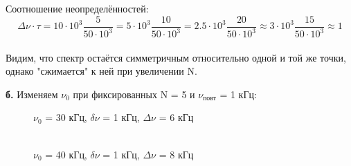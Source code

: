 \documentclass[a4paper,12pt]{article} %
\begin{document}
\begin{enumerate}
	      Соотношение неопределённостей:
	      $$ \Delta \nu \cdot \tau = 10\cdot10^3\frac{5}{50\cdot10^3} = 5\cdot10^3\frac{10}{50\cdot10^3} = 2.5\cdot10^3\frac{20}{50\cdot10^3} \approx 3\cdot10^3\frac{15}{50\cdot10^3} \approx 1 $$\\

	      Видим, что спектр остаётся симметричным относительно одной и той же точки, однако "сжимается" к ней при увеличении N.


	      \newpage

	      \textbf{б.} Изменяем $\nu_0$ при фиксированных N = 5 и $\nu_\text{повт}$ = 1 кГц:

	      \begin{figure}[h]
		      \begin{minipage}[h]{0.47\linewidth}
			       $\nu_0$ = 30 кГц, $\delta \nu$ = 1 кГц, $\Delta \nu$ = 6 кГц  \\
		      \end{minipage}
		      \hfill
		      \begin{minipage}[h]{0.47\linewidth}
			       \\ $\nu_0$ = 40 кГц, $\delta \nu$ = 1 кГц, $\Delta \nu$ = 8 кГц

\end{minipage}
\end{figure}
\end{enumerate}
\end{document}
